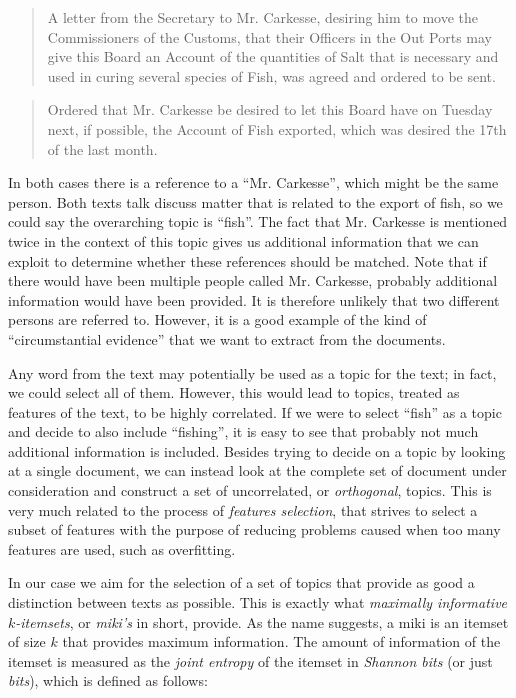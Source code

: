 \begin{quote}
    A letter from the Secretary to Mr. Carkesse, desiring him to move the Commissioners of the Customs, that their Officers in the Out Ports may give this Board an Account of the quantities of Salt that is necessary and used in curing several species of Fish, was agreed and ordered to be sent.
\end{quote}

\begin{quote}
    Ordered that Mr. Carkesse be desired to let this Board have on Tuesday next, if possible, the Account of Fish exported, which was desired the 17th of the last month.
\end{quote}

\noindent In both cases there is a reference to a ``Mr. Carkesse'', which might be the same person.
Both texts talk discuss matter that is related to the export of fish, so we could say the overarching topic is ``fish''.
The fact that Mr. Carkesse is mentioned twice in the context of this topic gives us additional information that we can exploit to determine whether these references should be matched.
Note that if there would have been multiple people called Mr. Carkesse, probably additional information would have been provided.
It is therefore unlikely that two different persons are referred to.
However, it is a good example of the kind of ``circumstantial evidence'' that we want to extract from the documents.

Any word from the text may potentially be used as a topic for the text; in fact, we could select all of them.
However, this would lead to topics, treated as features of the text, to be highly correlated.
If we were to select ``fish'' as a topic and decide to also include ``fishing'', it is easy to see that probably not much additional information is included.
Besides trying to decide on a topic by looking at a single document, we can instead look at the complete set of document under consideration and construct a set of uncorrelated, or \emph{orthogonal}, topics.
This is very much related to the process of \emph{features selection}, that strives to select a subset of features with the purpose of reducing problems caused when too many features are used, such as overfitting.

In our case we aim for the selection of a set of topics that provide as good a distinction between texts as possible.
This is exactly what \emph{maximally informative $k$-itemsets}\citep{Knobbe2006}, or \emph{miki's} in short, provide.
As the name suggests, a miki is an itemset of size $k$ that provides maximum information.
The amount of information of the itemset is measured as the \emph{joint entropy} of the itemset in \emph{Shannon bits} (or just \emph{bits}), which is defined as follows: \citep{Knobbe2006}

